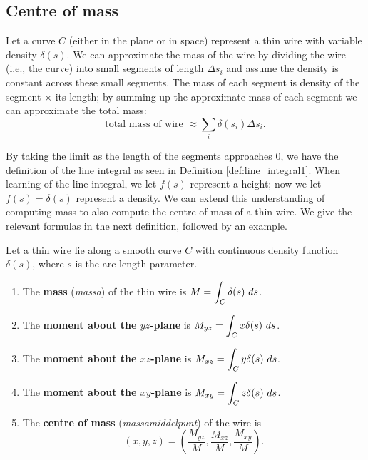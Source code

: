 \subsection{Centre of mass}
Let a curve $C$ (either in the plane or in space) represent a thin wire with variable density $\delta(s)$. We can approximate the mass of the wire by dividing the wire (i.e., the curve) into small segments of length $\Delta s_i$ and assume the density is constant across these small segments. The mass of each segment is density of the segment $\times$ its length; by summing up the approximate mass of each segment we can approximate the total mass:
$$\text{total mass of wire } \approx \sum\limits_i \delta(s_i)\Delta s_i.$$

By taking the limit as the length of the segments approaches 0, we have the definition of the line integral as seen in Definition \ref{def:line_integral1}. When learning of the line integral, we let $f(s)$ represent a height; now we let $f(s) = \delta(s)$ represent a density. We can extend this understanding of computing mass to also compute the centre of mass of a thin wire. We give the relevant formulas in the next definition, followed by an example.

\begin{definition}\label{def:mass_of_thin_wire}
Let a thin wire lie along a smooth curve $C$ with continuous density function $\delta(s)$, where $s$ is the arc length parameter. 	%
\begin{enumerate}
	\item The \textbf{mass} (\textit{massa}) of the thin wire is $\ds M = \int_C \delta(s)\ ds$.
	\item The \textbf{moment about the $yz$-plane} is $\ds M_{yz} = \int_C x\delta(s)\ ds$.
	\item The \textbf{moment about the $xz$-plane} is $\ds M_{xz} = \int_C y\delta(s)\ ds$.
	\item The \textbf{moment about the $xy$-plane} is $\ds M_{xy} = \int_C z\delta(s)\ ds$.
	\item The \textbf{centre of mass} (\textit{massamiddelpunt}) of the wire is $$(\overline{x},\overline{y},\overline{z}) = \left(\frac{M_{yz}}M, \frac{M_{xz}}M,\frac{M_{xy}}M\right).$$
\end{enumerate}
\end{definition}

